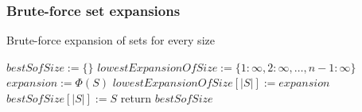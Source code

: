 \documentclass{beamer}
\begin{document}
\begin{frame}

\frametitle{Brute-force set expansions}
\begin{algorithm}[H]
\caption{Brute-force expansion of sets for every size   \label{alg:brute_force_size_just_one_side}}
\begin{algorithmic}[0]
	\State $bestSofSize := \{\}$
	\State $lowestExpansionOfSize := \{1:\infty, 2:\infty, \ldots, n-1: \infty \}$
	\State $expansion :=  \Phi(S)$
	\State $ lowestExpansionOfSize[|S|] := expansion$
	\State $bestSofSize[|S|] := S$
	\EndIf
	\EndFor	
	\State return $bestSofSize$
	\EndFunction
\end{algorithmic}
\end{algorithm}

\end{frame}
\end{document}
